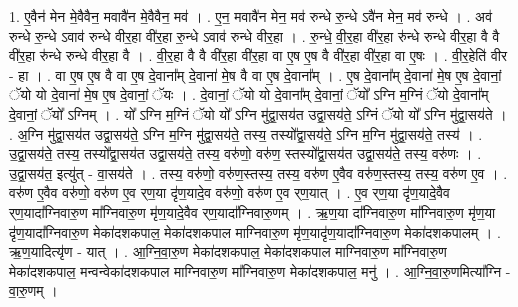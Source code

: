 \documentclass[17pt]{extarticle}
\begin{document}
1. ए॒वैन॑ मेन मे॒वैवैन॒ मवावै॑न मे॒वैवैन॒ मव॑ । . ए॒न॒ मवावै॑न मेन॒ मव॑ रुन्धे रु॒न्धे ऽवै॑न मेन॒ मव॑ रुन्धे । . अव॑ रुन्धे रु॒न्धे ऽवाव॑ रुन्धे वीर॒हा वी॑र॒हा रु॒न्धे ऽवाव॑ रुन्धे वीर॒हा । . रु॒न्धे॒ वी॒र॒हा वी॑र॒हा रु॑न्धे रुन्धे वीर॒हा वै वै वी॑र॒हा रु॑न्धे रुन्धे वीर॒हा वै । . वी॒र॒हा वै वै वी॑र॒हा वी॑र॒हा वा ए॒ष ए॒ष वै वी॑र॒हा वी॑र॒हा वा ए॒षः । . वी॒र॒हेति॑ वीर - हा । . वा ए॒ष ए॒ष वै वा ए॒ष दे॒वाना᳚म् दे॒वाना॑ मे॒ष वै वा ए॒ष दे॒वाना᳚म् । . ए॒ष दे॒वाना᳚म् दे॒वाना॑ मे॒ष ए॒ष दे॒वानां॒ ॅयो यो दे॒वाना॑ मे॒ष ए॒ष दे॒वानां॒ ॅयः । . दे॒वानां॒ ॅयो यो दे॒वाना᳚म् दे॒वानां॒ ॅयो᳚ ऽग्नि म॒ग्निं ॅयो दे॒वाना᳚म् दे॒वानां॒ ॅयो᳚ ऽग्निम् । . यो᳚ ऽग्नि म॒ग्निं ॅयो यो᳚ ऽग्नि मु॑द्वा॒सय॑त उद्वा॒सय॑ते॒ ऽग्निं ॅयो यो᳚ ऽग्नि मु॑द्वा॒सय॑ते । . अ॒ग्नि मु॑द्वा॒सय॑त उद्वा॒सय॑ते॒ ऽग्नि म॒ग्नि मु॑द्वा॒सय॑ते॒ तस्य॒ तस्यो᳚द्वा॒सय॑ते॒ ऽग्नि म॒ग्नि मु॑द्वा॒सय॑ते॒ तस्य॑ । . उ॒द्वा॒सय॑ते॒ तस्य॒ तस्यो᳚द्वा॒सय॑त उद्वा॒सय॑ते॒ तस्य॒ वरु॑णो॒ वरु॑ण॒ स्तस्यो᳚द्वा॒सय॑त उद्वा॒सय॑ते॒ तस्य॒ वरु॑णः । . उ॒द्वा॒सय॑त॒ इत्यु॑त् - वा॒सय॑ते । . तस्य॒ वरु॑णो॒ वरु॑ण॒स्तस्य॒ तस्य॒ वरु॑ण ए॒वैव वरु॑ण॒स्तस्य॒ तस्य॒ वरु॑ण ए॒व । . वरु॑ण ए॒वैव वरु॑णो॒ वरु॑ण ए॒व र्‌ण॒या दृ॑ण॒यादे॒व वरु॑णो॒ वरु॑ण ए॒व र्‌ण॒यात् । . ए॒व र्‌ण॒या दृ॑ण॒यादे॒वैव र्‌ण॒यादा᳚ग्निवारु॒ण मा᳚ग्निवारु॒ण मृ॑ण॒यादे॒वैव र्‌ण॒यादा᳚ग्निवारु॒णम् । . ऋ॒ण॒या दा᳚ग्निवारु॒ण मा᳚ग्निवारु॒ण मृ॑ण॒या दृ॑ण॒यादा᳚ग्निवारु॒ण मेका॑दशकपाल॒ मेका॑दशकपाल माग्निवारु॒ण मृ॑ण॒यादृ॑ण॒यादा᳚ग्निवारु॒ण मेका॑दशकपालम् । . ऋ॒ण॒यादित्यृ॑ण - यात् । . आ॒ग्नि॒वा॒रु॒ण मेका॑दशकपाल॒ मेका॑दशकपाल माग्निवारु॒ण मा᳚ग्निवारु॒ण मेका॑दशकपाल॒ मन्वन्वेका॑दशकपाल माग्निवारु॒ण मा᳚ग्निवारु॒ण मेका॑दशकपाल॒ मनु॑ । . आ॒ग्नि॒वा॒रु॒णमित्या᳚ग्नि - वा॒रु॒णम् । \newline
\end{document}
